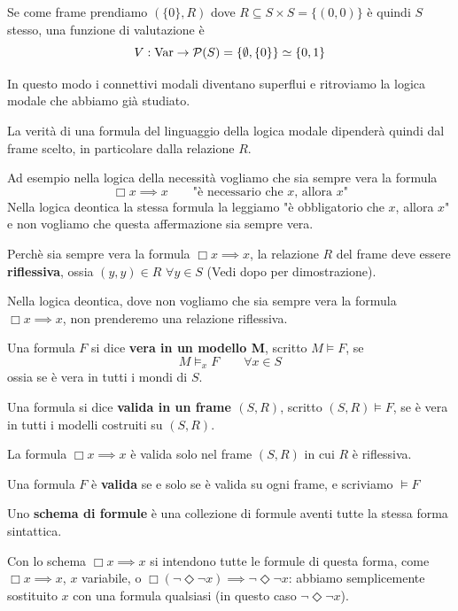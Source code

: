 \documentclass[../main.tex]{subfiles}
\begin{document}
Se come frame prendiamo $(\{0\},R)$ dove $R \subseteq S \times S = \{(0,0)\}$ è quindi $S$ stesso, una funzione di valutazione è
\[
    V : \operatorname{Var} \rightarrow \mathcal{P}(S) = \{\emptyset, \{0\}\} \simeq \{0,1\}
\]

In questo modo i connettivi modali diventano superflui e ritroviamo la logica modale che abbiamo già studiato.

La verità di una formula del linguaggio della logica modale dipenderà quindi dal frame scelto, in particolare dalla relazione $R$.

Ad esempio nella logica della necessità vogliamo che sia sempre vera la formula
\begin{equation*}
    \Box x \implies x \qquad \text{"è necessario che $x$, allora $x$"}
\end{equation*}
Nella logica deontica la stessa formula la leggiamo "è obbligatorio che $x$, allora $x$" e non vogliamo che questa affermazione sia sempre vera.

Perchè sia sempre vera la formula $\Box x \implies x$, la relazione $R$ del frame deve essere \textbf{riflessiva}, ossia $(y,y) \in R$ $\forall y \in S$ (Vedi dopo per dimostrazione).

Nella logica deontica, dove non vogliamo che sia sempre vera la formula $\Box x \implies x$, non prenderemo una relazione riflessiva.
\begin{definition}
    Una formula $F$ si dice \textbf{vera in un modello M}, scritto \textbf{$M \vDash F$}, se
    \[
        M \vDash_x F \qquad \forall x \in S
    \]
    ossia se è vera in tutti i mondi di $S$.
\end{definition}
\begin{definition}
    Una formula si dice \textbf{valida in un frame $(S,R)$}, scritto $(S,R) \vDash F$, se è vera in tutti i modelli costruiti su $(S,R)$.
\end{definition}
\begin{example}
    La formula $\Box x \implies x$ è valida solo nel frame $(S,R)$ in cui $R$ è riflessiva.
\end{example}
\begin{definition}
    Una formula $F$ è \textbf{valida} se e solo se è valida su ogni frame, e scriviamo $\vDash F$
\end{definition}
\begin{definition}
    Uno \textbf{schema di formule} è una collezione di formule aventi tutte la stessa forma sintattica.
\end{definition}
\begin{example}
    Con lo schema $\Box x \implies x$ si intendono tutte le formule di questa forma, come $\Box x \implies x$, $x$ variabile, o $\Box (\neg \Diamond \neg x) \implies \neg \Diamond \neg x$: abbiamo semplicemente sostituito $x$ con una formula qualsiasi (in questo caso $\neg \Diamond \neg x$).
\end{example}
\end{document}
